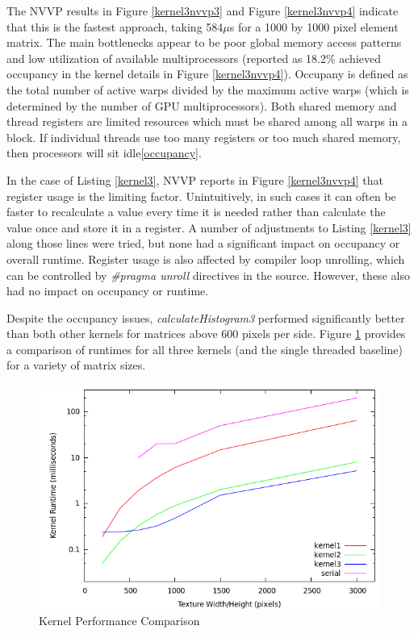 \documentclass{article}
\begin{document}
The NVVP results in Figure \ref{kernel3nvvp3} and Figure \ref{kernel3nvvp4} indicate that this is the fastest approach, taking 584$\mu$s for a 1000 by 1000 pixel element matrix. The main bottlenecks appear to be poor global memory access patterns and low utilization of available multiprocessors (reported as 18.2\% achieved occupancy in the kernel details in Figure \ref{kernel3nvvp4}). Occupany is defined as the total number of active warps divided by the maximum active warps (which is determined by the number of GPU multiprocessors). Both shared memory and thread registers are limited resources which must be shared among all warps in a block. If individual threads use too many registers or too much shared memory, then processors will sit idle\ref{occupancy}.

In the case of Listing \ref{kernel3}, NVVP reports in Figure \ref{kernel3nvvp4} that register usage is the limiting factor. Unintuitively, in such cases it can often be faster to recalculate a value every time it is needed rather than calculate the value once and store it in a register. A number of adjustments to Listing \ref{kernel3} along those lines were tried, but none had a significant impact on occupancy or overall runtime. Register usage is also affected by compiler loop unrolling, which can be controlled by \emph{#pragma unroll} directives in the source. However, these also had no impact on occupancy or runtime.

Despite the occupancy issues, \emph{calculateHistogram3} performed significantly better than both other kernels for matrices above 600 pixels per side. Figure \ref{comparison1} provides a comparison of runtimes for all three kernels (and the single threaded baseline) for a variety of matrix sizes.

\begin{figure}
\centering
\includegraphics[width=1.0\textwidth]{screenshots/performance.png}
\caption{Kernel Performance Comparison}
\label{comparison1}
\end{figure}
\end{document}
